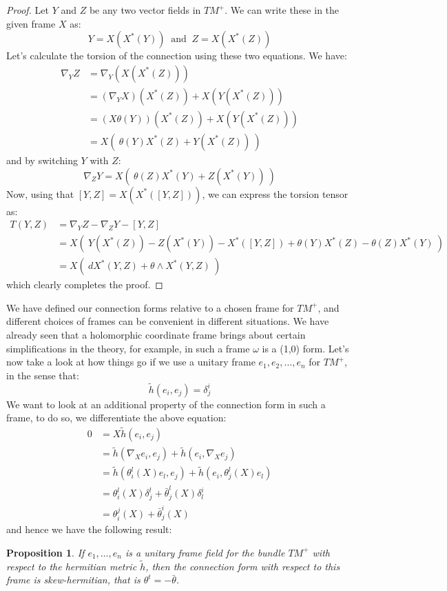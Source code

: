 \documentclass[11pt]{amsart}
\newtheorem{prop}[subsection]{Proposition}
\theoremstyle{definition}
\def \hsquig{ \tilde{h} }
\begin{document}
\begin{proof}
%
Let $Y$ and $Z$ be any two vector fields in $TM^{+}$.  We can write these in the given frame $X$ as:
%
$$ Y = X( X^{\ast}(Y) ) \ \text{ and } \ Z = X( X^{\ast}(Z) ) $$
%
Let's calculate the torsion of the connection using these two equations.  We have:
%
\begin{align*}
\nabla_Y Z &= \nabla_Y ( X( X^{\ast}(Z) ) ) \\
&= (\nabla_Y X) ( X^{\ast}(Z) ) + X( Y( X^{\ast}(Z) ) ) \\
&= ( X \theta(Y) ) ( X^{\ast}(Z) ) + X( Y( X^{\ast}(Z) ) ) \\
&= X( \ \theta(Y) X^{\ast}(Z) + Y( X^{\ast}(Z)) \ )
\end{align*}
%
and by switching $Y$ with $Z$:
%
$$ \nabla_Z Y = X( \ \theta(Z) X^{\ast}(Y) + Z( X^{\ast}(Y)) \ ) $$
%
Now, using that $[Y,Z] = X( X^{\ast}( [Y,Z] ) )$, we can express the torsion tensor as:
%
\begin{align*}
T(Y,Z) &= \nabla_Y Z - \nabla_Z Y - [Y,Z] \\
&= X( \ Y( X^{\ast}(Z)) - Z( X^{\ast}(Y)) - X^{\ast}( [Y,Z] ) + \theta(Y) X^{\ast}(Z) - \theta(Z) X^{\ast}(Y) \ ) \\
&= X( \ d X^{\ast}(Y,Z) + \theta \wedge X^{\ast} (Y,Z) \ )
\end{align*}
%
which clearly completes the proof.
%
\end{proof}

We have defined our connection forms relative to a chosen frame for $TM^{+}$, and different choices of frames can be convenient in different situations.  We have already seen that a holomorphic coordinate frame brings about certain simplifications in the theory, for example, in such a frame $\omega$ is a (1,0) form.  Let's now take a look at how things go if we use a unitary frame $e_1, e_2, \ldots, e_n$ for $TM^{+}$, in the sense that:
%
$$ \hsquig ( e_i, e_j ) = \delta^i_j $$
%
We want to look at an additional property of the connection form in such a frame, to do so, we differentiate the above equation:
%
\begin{align*}
0 &= X \hsquig ( e_i, e_j ) \\
&= \hsquig ( \nabla_X e_i, e_j ) + \hsquig ( e_i, \nabla_X e_j ) \\
&= \hsquig ( \theta^l_i (X) e_l, e_j ) + \hsquig ( e_i, \theta^l_j (X) e_l ) \\
&= \theta^l_i (X) \delta^l_j + \bar{\theta}^l_j (X) \delta^i_l \\
&= \theta^j_i (X) + \bar{\theta}^i_j (X)
\end{align*}
%
and hence we have the following result:
%
\begin{prop} If $e_1, \ldots, e_n$ is a unitary frame field for the bundle $TM^{+}$ with respect to the hermitian metric $\hsquig$, then the connection form with respect to this frame is skew-hermitian, that is $ \theta^{t} = - \bar{ \theta } $.
\end{prop}
\end{document}
